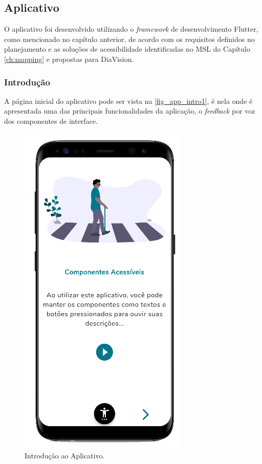 \newpage

\subsection{Aplicativo}

O aplicativo foi desenvolvido utilizando o \emph{framework} de desenvolvimento Flutter, como mencionado
no capítulo anterior, de acordo com os requisitos definidos no planejamento e as soluções de acessibilidade
identificadas no MSL do Capítulo \ref{ch:mapping} e propostas para DiaVision.

\subsubsection{Introdução}

A página inicial do aplicativo pode ser vista na \autoref{fig_app_intro1}, é nela onde é apresentada
uma das principais funcionalidades da aplicação, o \emph{feedback} por voz dos componentes de interface.

\begin{figure}[htb]
    \caption{\label{fig_app_intro1}Introdução ao Aplicativo.}
    \begin{center}
        \includegraphics[scale=0.70]{Imagens/desenvolvimento/app/intro_1.png}
    \end{center}
\end{figure}

